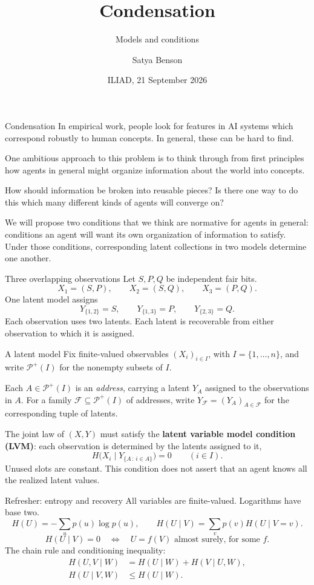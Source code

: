 \documentclass[aspectratio=169,12pt]{beamer}
\title{Condensation}
\subtitle{Models and conditions}
\author{Satya Benson}
\date{ILIAD, 21 September 2026}
\newcommand{\PI}{\mathcal P^+(I)}
\begin{document}
\begin{frame}{Condensation}
In empirical work, people look for features in AI systems which correspond
robustly to human concepts. In general, these can be hard to find.
\medskip

One ambitious approach to this problem is to think through from first
principles how agents in general might organize information about the world
into concepts.
\medskip

How should information be broken into reusable pieces? Is there one way to do
this which many different kinds of agents will converge on?
\medskip

We will propose two conditions that we think are normative for agents in
general: conditions an agent will want its own organization of information to
satisfy. Under those conditions, corresponding latent collections in two models
determine one another.
\end{frame}

\begin{frame}{Three overlapping observations}
Let $S,P,Q$ be independent fair bits.
\[
X_1=(S,P),\qquad X_2=(S,Q),\qquad X_3=(P,Q).
\]
One latent model assigns
\[
Y_{\{1,2\}}=S,\qquad Y_{\{1,3\}}=P,\qquad Y_{\{2,3\}}=Q.
\]
Each observation uses two latents. Each latent is recoverable from either
observation to which it is assigned.
\end{frame}

\begin{frame}{A latent model}
Fix finite-valued observables $(X_i)_{i\in I}$, with $I=\{1,\ldots,n\}$, and
write $\PI$ for the nonempty subsets of $I$.
\medskip

Each $A\in\PI$ is an \emph{address}, carrying a latent $Y_A$ assigned to the
observations in $A$. For a family $\mathcal F\subseteq\PI$ of addresses, write
$Y_{\mathcal F}=(Y_A)_{A\in\mathcal F}$ for the corresponding tuple of latents.
\medskip

The joint law of $(X,Y)$ must satisfy the \textbf{latent variable model
condition (LVM)}: each observation is determined by the latents assigned to it,
\[
H\bigl(X_i\mid Y_{\{A\,:\,i\in A\}}\bigr)=0\qquad(i\in I).
\]
Unused slots are constant. This condition does not assert that an agent knows
all the realized latent values.
\end{frame}

\begin{frame}{Refresher: entropy and recovery}
All variables are finite-valued. Logarithms have base two.
\[
H(U)=-\sum_u p(u)\log p(u),\qquad
H(U\mid V)=\sum_v p(v)H(U\mid V=v).
\]
\[
H(U\mid V)=0
\quad\Longleftrightarrow\quad
U=f(V)\text{ almost surely, for some }f.
\]
The chain rule and conditioning inequality:
\[
\begin{aligned}
H(U,V\mid W)&=H(U\mid W)+H(V\mid U,W),\\
H(U\mid V,W)&\le H(U\mid W).
\end{aligned}
\]
\end{frame}
\end{document}
